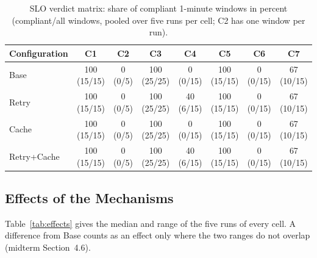 \documentclass[10pt]{article}
\begin{document}
\begin{table}[htbp]
\centering
\footnotesize
\begin{tabular}{@{}lccccccc@{}}
\toprule
\textbf{Configuration} & \textbf{C1} & \textbf{C2} & \textbf{C3} & \textbf{C4} & \textbf{C5} & \textbf{C6} & \textbf{C7} \\
\midrule
Base & 100 (15/15) & 0 (0/5) & 100 (25/25) & 0 (0/15) & 100 (15/15) & 0 (0/15) & 67 (10/15) \\
Retry & 100 (15/15) & 0 (0/5) & 100 (25/25) & 40 (6/15) & 100 (15/15) & 0 (0/15) & 67 (10/15) \\
Cache & 100 (15/15) & 0 (0/5) & 100 (25/25) & 0 (0/15) & 100 (15/15) & 0 (0/15) & 67 (10/15) \\
Retry+Cache & 100 (15/15) & 0 (0/5) & 100 (25/25) & 40 (6/15) & 100 (15/15) & 0 (0/15) & 67 (10/15) \\
\bottomrule
\end{tabular}
\caption{SLO verdict matrix: share of compliant 1-minute windows in percent
(compliant/all windows, pooled over five runs per cell; C2 has one window per
run).}
\label{tab:slo-matrix}
\end{table}

\subsection{Effects of the Mechanisms}
\label{sec:effects-anchor}
Table~\ref{tab:effects} gives the median and range of the five runs of every
cell. A difference from Base counts as an effect only where the two ranges do
not overlap (midterm Section~4.6).
\end{document}
